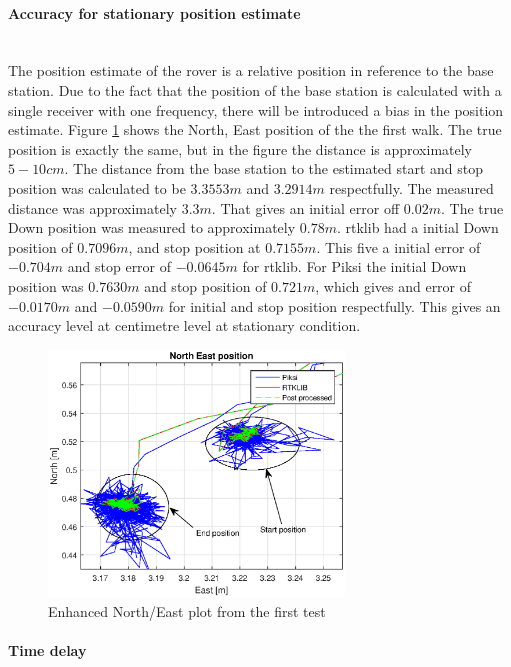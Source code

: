 \paragraph{Accuracy for stationary position estimate}~\\

The position estimate of the rover is a relative position in reference to the base station. Due to the fact that the position of the base station is calculated with a single receiver with one frequency, there will be introduced a bias in the position estimate. Figure \ref{figure:enhancedxywalk1} shows the North, East position of the the first walk. The true position is exactly the same, but in the figure the distance is approximately $5-10cm$. The distance from the base station to the estimated start and stop position was calculated to be $3.3553m$ and $3.2914m$ respectfully. The measured distance was approximately $3.3m$. That gives an initial error off $0.02m$. The true Down position was measured to approximately $0.78m$. \gls{rtklib} had a initial Down position of $0.7096m$, and stop position at $0.7155m$. This five a initial error of $-0.704m$ and stop error of $-0.0645m$ for \gls{rtklib}. For Piksi the initial Down position was $0.7630m$ and stop position of $0.721m$, which gives and error of $-0.0170m$ and $-0.0590m$ for initial and stop position respectfully. This gives an accuracy level at centimetre level at stationary condition. 
\begin{figure}[H]
	\centering
		\includegraphics[width=0.7\textwidth]{figs/plots/enhancedxywalk1.eps}
		\caption{Enhanced North/East plot from the first test}
		\label{figure:enhancedxywalk1}
\end{figure}
\paragraph{Time delay}~\\

